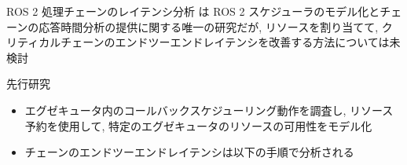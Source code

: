 {    \begin{frame}{ROS 2 処理チェーンのレイテンシ分析}
        \cite{casini2019response} は ROS 2 スケジューラのモデル化とチェーンの応答時間分析の提供に関する唯一の研究だが, リソースを割り当てて, クリティカルチェーンのエンドツーエンドレイテンシを改善する方法については未検討
        \begin{block}{先行研究 \cite{casini2019response}}
            \setlength{\linewidth}{0.98\columnwidth}
            \setlength{\wideitemsep}{0.8\itemsep}
            {\footnotesize
                \begin{itemize}
                    \item エグゼキュータ内のコールバックスケジューリング動作を調査し, リソース予約を使用して, 特定のエグゼキュータのリソースの可用性をモデル化
                    \item チェーンのエンドツーエンドレイテンシは以下の手順で分析される
                \end{itemize}
            }
        \end{block}
    \end{frame}
}
